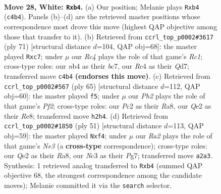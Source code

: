 \documentclass[11pt]{article}
\begin{document}
\clearpage

\begin{figure}[p]\centering
\begin{subfigure}{0.46\textwidth}\centering
\resizebox{\linewidth}{!}{%
\newchessgame
\chessboard[
  setfen={r2qr3/ppp3k1/3bbpp1/3P3p/PnR5/2N3P1/RPP1QP1P/2B3K1 w - - 0 28},
  showmover=false,
  pgfstyle=straightmove, color=movearrow, markmove={c4-b4}
]}
\caption{}
\end{subfigure}\hfill
\begin{subfigure}{0.46\textwidth}\centering
\resizebox{\linewidth}{!}{%
\newchessgame
\chessboard[
  setfen={2r5/1pBqr1bk/3p1np1/1N1P1p1p/2P1pP2/1P4P1/2BQR2P/3R2K1 b - - 0 36},
  showmover=false,
  pgfstyle=straightmove, color=movearrow, markmove={c8-c7}
]}
\caption{}
\end{subfigure}
\\[4pt]
\begin{subfigure}{0.46\textwidth}\centering
\resizebox{\linewidth}{!}{%
\newchessgame
\chessboard[
  setfen={r3rnk1/pb1n1p1p/1q4pB/1P1pN3/2pP1P2/6P1/3Q2BP/4RRK1 b - - 2 33},
  showmover=false,
  pgfstyle=straightmove, color=movearrow, markmove={f7-f5}
]}
\caption{}
\end{subfigure}\hfill
\begin{subfigure}{0.46\textwidth}\centering
\resizebox{\linewidth}{!}{%
\newchessgame
\chessboard[
  setfen={r4r2/1p4pk/3pn1qp/p1p1p3/2P1PN2/5P2/PPQ3PP/3RR1BK b - - 0 26},
  showmover=false,
  pgfstyle=straightmove, color=movearrow, markmove={e6-f4}
]}
\caption{}
\end{subfigure}
\caption{\textbf{Move 28, White: \texttt{Rxb4}.} (a) Our position; Melanie plays \texttt{Rxb4} (\texttt{c4b4}). Panels (b)--(d) are the retrieved master positions whose correspondence most drove this move (highest QAP objective among those that transfer to it). (b) Retrieved from \texttt{ccrl\_top\_p0002\#3617} (ply 71) [structural distance $d$=104, QAP obj=68]: the master played \texttt{Rxc7}; under $\mu$ our \emph{Rc4} plays the role of that game's \emph{Rc1}; cross-type roles: our \emph{n}b4 as their \emph{b}c7, our \emph{R}c4 as their \emph{Q}d7; transferred move \texttt{c4b4} \textbf{(endorses this move)}. (c) Retrieved from \texttt{ccrl\_top\_p0002\#567} (ply 65) [structural distance $d$=112, QAP obj=60]: the master played \texttt{f5}; under $\mu$ our \emph{Ph2} plays the role of that game's \emph{Pf2}; cross-type roles: our \emph{P}c2 as their \emph{R}a8, our \emph{Q}e2 as their \emph{R}e8; transferred move \texttt{h2h4}. (d) Retrieved from \texttt{ccrl\_top\_p0002\#1850} (ply 51) [structural distance $d$=113, QAP obj=59]: the master played \texttt{Nxf4}; under $\mu$ our \emph{Ra2} plays the role of that game's \emph{Ne3} (a \textbf{cross-type} correspondence); cross-type roles: our \emph{Q}e2 as their \emph{R}a8, our \emph{N}c3 as their \emph{P}g7; transferred move \texttt{a2a3}. Synthesis: 1 retrieved analog transferred to \texttt{Rxb4} (summed QAP objective 68, the strongest correspondence among the candidate moves); Melanie committed it via the \texttt{search} selector.}
\label{fig:thought-m54}
\end{figure}
\end{document}
